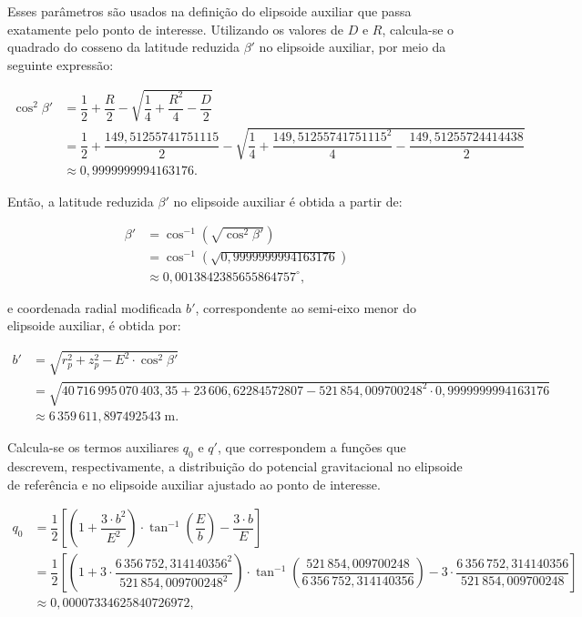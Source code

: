 \noindent
Esses parâmetros são usados na definição do elipsoide auxiliar que passa exatamente pelo ponto de interesse. Utilizando os valores de \(D\) e \(R\), calcula-se o quadrado do cosseno da latitude reduzida \(\beta'\) no elipsoide auxiliar, por meio da seguinte expressão:

\[
\begin{aligned}
\cos^2 \beta' &= \dfrac{1}{2} + \dfrac{R}{2} - \sqrt{ \dfrac{1}{4} + \dfrac{R^2}{4} - \dfrac{D}{2} } \\
              &= \dfrac{1}{2} + \dfrac{149{,}51255741751115}{2} - \sqrt{ \dfrac{1}{4} + \dfrac{149{,}51255741751115^2}{4} - \dfrac{149{,}51255724414438}{2} } \\
              &\approx 0{,}9999999994163176 \text{.}
\end{aligned}
\]

\noindent
Então, a latitude reduzida \(\beta'\) no elipsoide auxiliar é obtida a partir de:

\[
\begin{aligned}
   \beta' &= \cos^{-1}\left( \sqrt{\cos^2 \beta'} \right) \\
          &= \cos^{-1}\left( \sqrt{0{,}9999999994163176} \right) \\
          &\approx 0{,}0013842385655864757^\circ \text{,}
\end{aligned}
\]

\noindent
e coordenada radial modificada \(b'\), correspondente ao semi-eixo menor do elipsoide auxiliar, é obtida por:



\[
\begin{aligned}
   b' &= \sqrt{r_p^2 + z_p^2 - E^2 \cdot \cos^2 \beta'} \\
      &= \sqrt{40\,716\,995\,070\,403{,}35 + 23\,606{,}62284572807 - 521\,854{,}009700248^2 \cdot 0{,}9999999994163176} \\
     &\approx 6\,359\,611{,}897492543 \; \text{m} \text{.}
\end{aligned}
\]

\noindent
Calcula-se os termos auxiliares \(q_0\) e \(q'\), que correspondem a funções que descrevem, respectivamente, a distribuição do potencial gravitacional no elipsoide de referência e no elipsoide auxiliar ajustado ao ponto de interesse.




\[
\begin{aligned}
   q_0
   &= \dfrac{1}{2} \left[\left(1 + \dfrac{3 \cdot b^2}{E^2}\right) \cdot \tan^{-1}\!\left(\dfrac{E}{b}\right) - \dfrac{3 \cdot b}{E}\right]\\
   &= \dfrac{1}{2} \left[\left(1 + 3 \cdot \dfrac{6\,356\,752{,}314140356^2}{521\,854{,}009700248^2}\right) \cdot \tan^{-1}\!\left(\dfrac{521\,854{,}009700248}{6\,356\,752{,}314140356}\right) - 3 \cdot \dfrac{6\,356\,752{,}314140356}{521\,854{,}009700248}\right]\\
   &\approx 0{,}00007334625840726972 \text{,}
\end{aligned}
\]


